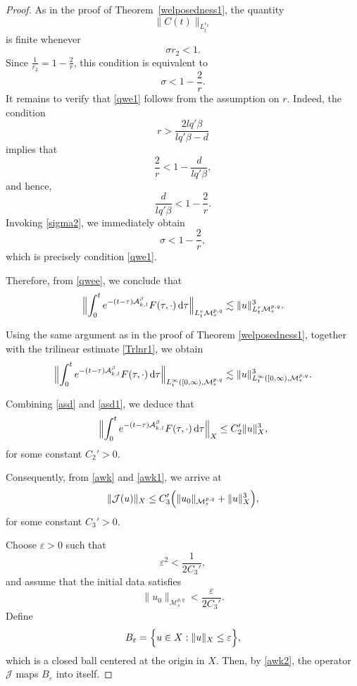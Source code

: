\documentclass[12pt,reqno,a4paper]{amsart}
\numberwithin{equation}{section}
\theoremstyle{plain}
\theoremstyle{definition}
\theoremstyle{remark}
\def\M{\mathcal{M}}
\def \Ad{\mathcal{A}_{k,l}}
\def \M{{\mathcal M}}
\begin{document}
\begin{proof}
As in the proof of Theorem~\ref{welposedness1}, the quantity
\[
\|C(t)\|_{L^{r_{2}}_{t}}
\]
is finite whenever
\[
\sigma r_{2}<1.
\]
Since \(\frac{1}{r_{2}}=1-\frac{2}{r}\), this condition is equivalent to
\begin{equation}
\label{qwe1}
\sigma
<
1-\frac{2}{r}.
\end{equation}
It remains to verify that \eqref{qwe1} follows from the assumption on \(r\). Indeed, the condition
\[
r>
\frac{2lq'\beta}{lq'\beta-d}
\]
implies that
\[
\frac{2}{r}
<
1-\frac{d}{lq'\beta},
\]
and hence,
\[
\frac{d}{lq'\beta}
<
1-\frac{2}{r}.
\]
Invoking \eqref{sigma2}, we immediately obtain
\[
\sigma
<
1-\frac{2}{r},
\]
which is precisely condition \eqref{qwe1}.

Therefore, from \eqref{qwee}, we conclude that
\begin{align}
\label{asd}
\Bigl\|
\int_{0}^{t}
e^{-(t-\tau)\Ad^{\beta}}
F(\tau,\cdot)\,\mathrm{d}\tau
\Bigr\|_{L^{r}_{t}\M^{p,q}_{s}}
\lesssim
\|u\|_{L^{r}_{t}\M^{p,q}_{s}}^{3}.
\end{align}


Using the same argument as in the proof of Theorem
\ref{welposedness1}, together with the trilinear estimate
\eqref{Trlnr1}, we obtain
\begin{align}
\label{asd1}
\Bigl\|
\int_{0}^{t}
e^{-(t-\tau)\Ad^{\beta}}
F(\tau,\cdot)\,\mathrm{d}\tau
\Bigr\|_{L^{\infty}_{t}([0,\infty),\M^{p,q}_{s}}
\lesssim
\|u\|^{3}_{L^{\infty}_{t}([0,\infty),\M^{p,q}_{s}}.
\end{align}

Combining \eqref{asd} and \eqref{asd1}, we deduce that
\begin{align}
\label{awk1}
\Bigl\|
\int_{0}^{t}
e^{-(t-\tau)\Ad^{\beta}}
F(\tau,\cdot)\,\mathrm{d}\tau
\Bigr\|_{X}
\leq
C_{2}'\|u\|_{X}^{3},
\end{align}
for some constant $C_{2}'>0$.

Consequently, from \eqref{awk} and \eqref{awk1}, we arrive at
\begin{align}
\label{awk2}
\|\mathcal{J}(u)\|_{X}
\leq
C_{3}'
\Bigl(
\|u_{0}\|_{\M^{p,q}_{s}}
+
\|u\|_{X}^{3}
\Bigr),
\end{align}
for some constant $C_{3}'>0$.

Choose $\varepsilon>0$ such that
\[
\varepsilon^{2}
<
\frac{1}{2C_{3}'},
\]
and assume that the initial data satisfies
\[
\|u_{0}\|_{\M^{p,q}_{s}}
<
\frac{\varepsilon}{2C_{3}'}.
\]
Define
\[
B_{\varepsilon}
=
\Bigl\{
u\in X
:
\|u\|_{X}\leq \varepsilon
\Bigr\},
\]
which is a closed ball centered at the origin in $X$.
Then, by \eqref{awk2}, the operator $\mathcal{J}$ maps
$B_{\varepsilon}$ into itself.


\end{proof}
\end{document}
